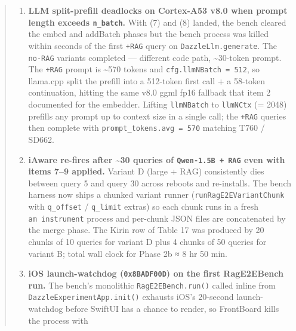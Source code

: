 \begin{quote}
\begin{enumerate}
  \texttt{addBatchDirect} / \texttt{searchDirect} returned silently with 0 hits.
  With the module loaded, the next layer of the bug surfaced: hnswlib's
  \texttt{BruteforceSearch::searchKnn} SIMD distance kernel segfaults on
  misaligned 16-byte NEON loads over the \texttt{{[}vec,\ label{]}} packed
  stride hnswlib uses, on Cortex-A53 + Bionic libstdc++. The fix mirrors every
  FLAT-path vector into \texttt{schema-\textgreater{}fp32\_store} and replaces
  \texttt{searchKnn} with a portable scalar brute-force scan; \textasciitilde2.5
  ms per query on N = 2 000, dim = 384 on Cortex-A53. HNSW path is unchanged.
\item
  \textbf{LLM split-prefill deadlocks on Cortex-A53 v8.0 when prompt length
  exceeds \texttt{n\_batch}.} With (7) and (8) landed, the bench cleared the
  embed and addBatch phases but the bench process was killed within seconds of
  the first \texttt{+RAG} query on \texttt{DazzleLlm.generate}. The
  \texttt{no-RAG} variants completed --- different code path,
  \textasciitilde30-token prompt. The \texttt{+RAG} prompt is \textasciitilde570
  tokens and \texttt{cfg.llmNBatch\ =\ 512}, so llama.cpp split the prefill into
  a 512-token first call + a 58-token continuation, hitting the same v8.0 ggml
  fp16 fallback that item 2 documented for the embedder. Lifting
  \texttt{llmNBatch} to \texttt{llmNCtx} (= 2048) prefills any prompt up to
  context size in a single call; the \texttt{+RAG} queries then complete with
  \texttt{prompt\_tokens.avg\ =\ 570} matching T760 / SD662.
\item
  \textbf{iAware re-fires after \textasciitilde30 queries of
  \texttt{Qwen-1.5B\ +\ RAG} even with items 7--9 applied.} Variant D (large +
  RAG) consistently dies between query 5 and query 30 across reboots and
  re-installs. The bench harness now ships a chunked variant runner
  (\texttt{runRagE2EVariantChunk} with \texttt{q\_offset} / \texttt{q\_limit}
  extras) so each chunk runs in a fresh \texttt{am\ instrument} process and
  per-chunk JSON files are concatenated by the merge phase. The Kirin row of
  Table 17 was produced by 20 chunks of 10 queries for variant D plus 4 chunks
  of 50 queries for variant B; total wall clock for Phase 2b ≈ 8 hr 50 min.
\item
  \textbf{iOS launch-watchdog (\texttt{0x8BADF00D}) on the first RagE2EBench
  run.} The bench's monolithic \texttt{RagE2EBench.run()} called inline from
  \texttt{DazzleExperimentApp.init()} exhausts iOS's 20-second launch-watchdog
  before SwiftUI has a chance to render, so FrontBoard kills the process with

\end{enumerate}
\end{quote}
